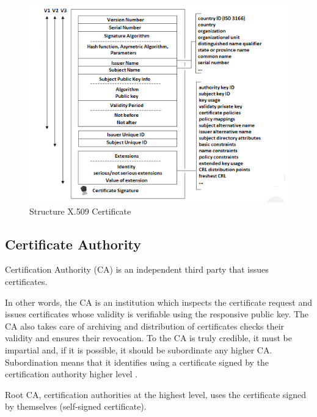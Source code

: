 \documentclass[
  digital, %
  notable,   %
  lof,     %
  lot,     %
]{fithesis3}
\begin{document}
\begin{figure}[th]
	\centering
	\includegraphics[width=1\textwidth]{certificate}
	\caption{Structure X.509 Certificate}
	\label{fig:certificate}
\end{figure}


\subsection{Certificate Authority}
Certification Authority (CA) is an independent third party that issues certificates. 

In other words, the CA is an institution which inspects the certificate request and issues 
certificates whose validity is verifiable using the responsive public key. The CA also takes 
care of archiving and distribution of certificates checks their validity and ensures their 
revocation. To the CA is truly credible, it must be impartial and, if it is possible, it 
should be subordinate any higher CA. Subordination means that it identifies using a 
certificate signed by the certification authority higher level \cite{dostalek2016velky}.

Root CA, certification authorities at the highest level, uses the certificate signed by 
themselves (self-signed certificate).
\end{document}
